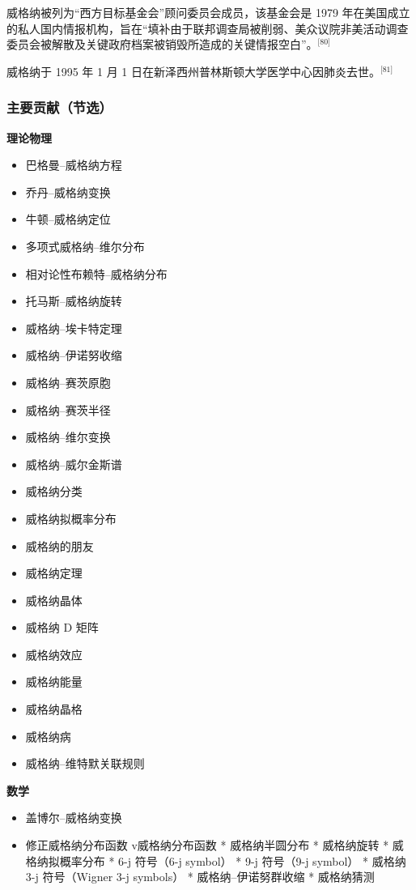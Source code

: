 威格纳被列为“西方目标基金会”顾问委员会成员，该基金会是 1979 年在美国成立的私人国内情报机构，旨在“填补由于联邦调查局被削弱、美众议院非美活动调查委员会被解散及关键政府档案被销毁所造成的关键情报空白”。\(^\text{[80]}\)

威格纳于 1995 年 1 月 1 日在新泽西州普林斯顿大学医学中心因肺炎去世。\(^\text{[81]}\)
\subsubsection{主要贡献（节选）}
\textbf{理论物理}
\begin{itemize}
\item 巴格曼–威格纳方程
\item 乔丹–威格纳变换
\item 牛顿–威格纳定位
\item 多项式威格纳–维尔分布
\item 相对论性布赖特–威格纳分布
\item 托马斯–威格纳旋转
\item 威格纳–埃卡特定理
\item 威格纳–伊诺努收缩
\item 威格纳–赛茨原胞
\item 威格纳–赛茨半径
\item 威格纳–维尔变换
\item 威格纳–威尔金斯谱
\item 威格纳分类
\item 威格纳拟概率分布
\item 威格纳的朋友
\item 威格纳定理
\item 威格纳晶体
\item 威格纳 D 矩阵
\item 威格纳效应
\item 威格纳能量
\item 威格纳晶格
\item 威格纳病
\item 威格纳–维特默关联规则
\end{itemize}
\textbf{数学}
\begin{itemize}
\item 盖博尔–威格纳变换
\item 修正威格纳分布函数
v威格纳分布函数
* 威格纳半圆分布
* 威格纳旋转
* 威格纳拟概率分布
* 6-j 符号（6-j symbol）
* 9-j 符号（9-j symbol）
* 威格纳 3-j 符号（Wigner 3-j symbols）
* 威格纳–伊诺努群收缩
* 威格纳猜测
\end{itemize}
